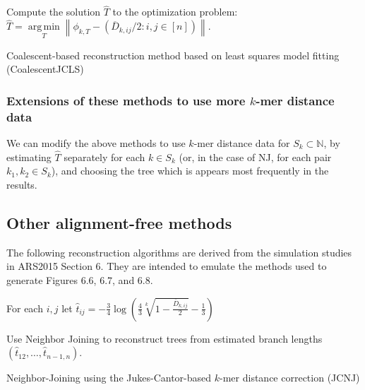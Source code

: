 \documentclass[12pt]{article}
\newcommand{\N}{\mathbb{N}}
\newcommand\norm[1]{\left\lVert#1\right\rVert}
\theoremstyle{definition}
\begin{document}
\begin{algorithm}[H]
           Compute the solution $\hat{T}$ to the optimization problem: $\hat{T} = \operatorname*{arg\,min}\limits_{T} \norm{ \phi_{k,T} - (\overline{D}_{k,ij}/2 : i,j \in [n]) }.$
 \caption{Coalescent-based reconstruction method based on least squares model fitting (CoalescentJCLS)}
 \label{algorithm:5taxoninvariant}
\end{algorithm}

\subsubsection{Extensions of these methods to use more $k$-mer distance data}

We can modify the above methods to use $k$-mer distance data for $S_k \subset \N$, by estimating $\hat{T}$ separately for each $k \in S_k$ (or, in the case of NJ, for each pair $k_1,k_2 \in S_k$), and choosing the tree which is appears most frequently in the results.

\subsection{Other alignment-free methods}

The following reconstruction algorithms are derived from the simulation studies in ARS2015 Section 6. They are intended to emulate the methods used to generate Figures 6.6, 6.7, and 6.8.

\begin{algorithm}[H]
 For each $i,j$ let 
 $\hat{t}_{ij} = -\frac{3}{4}\log\left(\frac{4}{3}\sqrt[k]{1 - \frac{\overline{D}_{k,ij}}{2}}-\frac{1}{3}\right)$

            Use Neighbor Joining to reconstruct trees from estimated branch lengths $(\hat{t}_{12}, \ldots, \hat{t}_{n-1,n})$.\;
 \caption{Neighbor-Joining using the Jukes-Cantor-based $k$-mer distance correction (JCNJ)}
 \label{algorithm:ARS2015+NJ}
\end{algorithm}
\end{document}
